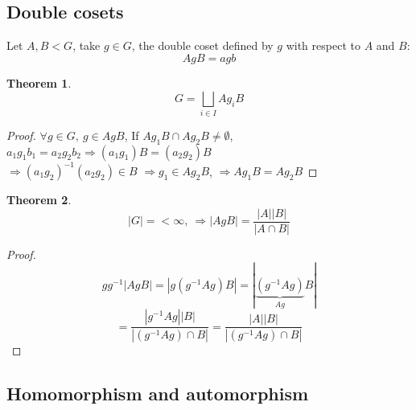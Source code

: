 \documentclass[12pt, a4paper]{article}
\newtheorem{theorem}{Theorem}[section]
\theoremstyle{definition}
\begin{document}
\subsection{Double cosets}
\par
Let $A, B<G$, take $g\in G$, the double coset defined by $g$ with respect to $A$ and $B$: 
\[AgB = {agb}\]
\begin{theorem}
    \[G=\bigsqcup_{i\in I}Ag_i B \]
\end{theorem}
\begin{proof}
    $\forall g\in G,\ g\in AgB $, If $ Ag_1B\cap Ag_2B\neq \emptyset$, \\
    $a_1g_1b_1 = a_2g_2b_2 \Rightarrow (a_1g_1)B= (a_2g_2)B$\\
    $\Rightarrow {(a_1g_2)}^{-1}(a_2g_2)\in B $
    $\Rightarrow g_1\in Ag_2B$, $\Rightarrow Ag_1B = Ag_2B$
    \par
\end{proof}  
\begin{theorem}
    \[|G|=<\infty,\ \Rightarrow|AgB|=\frac{|A||B|}{|A\cap B|}\]
\end{theorem}
\begin{proof}
    \[gg^{-1}|AgB|=|g(g^{-1}Ag)B|=|\underbrace{(g^{-1}Ag)}_{Ag} B| \]
    \[= \frac{|g^{-1}Ag||B|}{|(g^{-1}Ag)\cap B|} = \frac{|A||B|}{|(g^{-1}Ag)\cap B|}\]
\end{proof}
\subsection{Homomorphism and automorphism}
\end{document}
